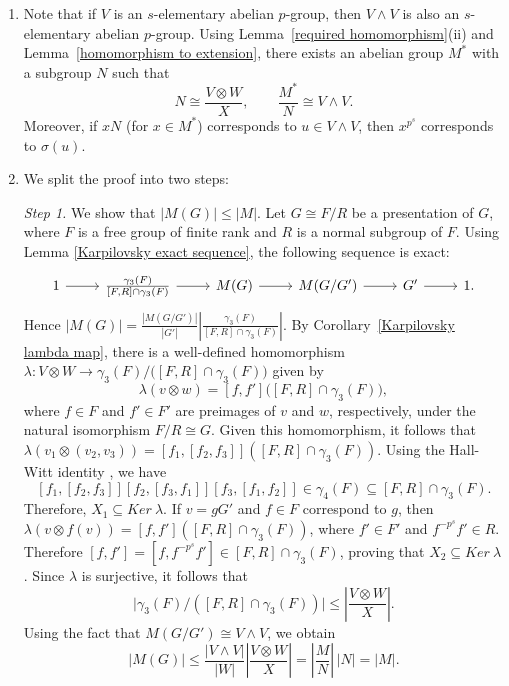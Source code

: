 \documentclass[preprint,sort&compress,12pt]{elsarticle}
\numberwithin{equation}{section}
\theoremstyle{definition}
\begin{document}
\begin{enumerate}
    \item 
Note that if $V$ is an $s$-elementary abelian $p$-group, then ${V \wedge V}$
is also an $s$-elementary abelian $p$-group. Using
Lemma~\ref{required homomorphism}(ii) and
Lemma~\ref{homomorphism to extension}, there exists an abelian group
$M^{*}$ with a subgroup $N$ such that
\[
N \cong \frac{V \otimes W}{X}, \qquad
\frac{M^{*}}{N} \cong V \wedge V.
\]
Moreover, if $xN$ (for $x \in M^{*}$) corresponds to $u \in V \wedge V$,
then $x^{p^{s}}$ corresponds to $\sigma(u)$.

\item We split the proof into two steps:
    
\noindent    \textit{Step 1.} We show that $|M(G)| \leq |M|$.
    Let $G \cong F/R$ be a presentation of $G$, where $F$ is a free group of
finite rank and $R$ is a normal subgroup of $F$. Using Lemma \ref{Karpilovsky exact sequence}, the following sequence is exact: 
\[
\begin{tikzcd}
 1 \arrow[r] & \frac{\gamma_3(F)}{[F,R] \cap \gamma_3(F)} \arrow[r] & M(G) \arrow[r] & M(G/G') \arrow[r] & G' \arrow[r] & 1.
\end{tikzcd}
\]
Hence $|M(G)|=\frac{|M(G/G')|}{|G'|}|\frac{\gamma_3(F)}{[F,R] \cap \gamma_3(F)}|$.
By Corollary~\ref{Karpilovsky lambda map}, there is a
well-defined homomorphism
$\lambda : V \otimes W \to
\gamma_{3}(F)/\bigl([F,R] \cap \gamma_{3}(F)\bigr)$
given by 
\[
\lambda(v \otimes w) =
[f,f']\bigl([F,R] \cap \gamma_{3}(F)\bigr),
\]
where $f \in F$ and $f' \in F'$ are preimages of $v$ and $w$, respectively,
under the natural isomorphism $F/R \cong G$.
Given this homomorphism, it follows that $\lambda(v_1 \otimes (v_2,v_3))=[f_1,[f_2,f_3]]([F,R] \cap \gamma_3(F))$.
Using the Hall-Witt identity \cite[Lemma 3.1.7]{Karp1987}, we have $$[f_1,[f_2,f_3]][f_2,[f_3,f_1]][f_3,[f_1,f_2]] \in \gamma_4(F) \subseteq [F,R] \cap \gamma_3(F).$$
Therefore, $X_1 \subseteq Ker \ \lambda$. If $v=gG'$ and $f \in F$ correspond to $g$, then $\lambda(v \otimes f(v))=[f,f']([F,R] \cap \gamma_3(F))$, where $f' \in F'$ and $f^{-p^s}f' \in R$. Therefore $[f,f']=[f,f^{-p^s}f'] \in [F,R] \cap \gamma_3(F)$,
proving that ${X_2 \subseteq Ker \ \lambda}$. Since $\lambda$ is surjective, it follows that
\[
\bigl|\gamma_{3}(F)/([F,R] \cap \gamma_{3}(F))\bigr|
\le \left|\frac{V \otimes W}{X}\right|.
\]
Using the fact that $M(G/G') \cong V \wedge V$, we obtain
\[
|M(G)|
\le \frac{|V \wedge V|}{|W|}
\left|\frac{V \otimes W}{X}\right|
= \left|\frac{M}{N}\right|\,|N|
= |M|.
\]




\end{enumerate}
\end{document}
